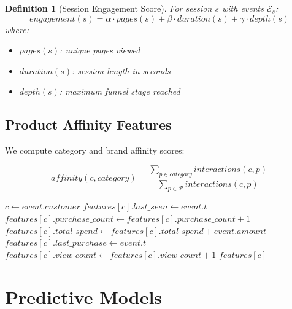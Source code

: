 \documentclass[11pt,a4paper]{article}
\newtheorem{definition}[theorem]{Definition}
\begin{document}
\begin{definition}[Session Engagement Score]
For session $s$ with events $\mathcal{E}_s$:
\begin{equation}
engagement(s) = \alpha \cdot pages(s) + \beta \cdot duration(s) + \gamma \cdot depth(s)
\end{equation}
where:
\begin{itemize}
    \item $pages(s)$: unique pages viewed
    \item $duration(s)$: session length in seconds
    \item $depth(s)$: maximum funnel stage reached
\end{itemize}
\end{definition}

\subsection{Product Affinity Features}

We compute category and brand affinity scores:

\begin{equation}
affinity(c, category) = \frac{\sum_{p \in category} interactions(c, p)}{\sum_{p \in \mathcal{P}} interactions(c, p)}
\end{equation}

\begin{algorithm}
\caption{Real-Time Feature Computation}
\begin{algorithmic}[1]
    \State $c \gets event.customer$
    \State $features[c].last\_seen \gets event.t$
        \State $features[c].purchase\_count \gets features[c].purchase\_count + 1$
        \State $features[c].total\_spend \gets features[c].total\_spend + event.amount$
        \State $features[c].last\_purchase \gets event.t$
        \State $features[c].view\_count \gets features[c].view\_count + 1$
        \State {}
    \EndIf
    \State {}
    \State \Return $features[c]$
\EndFunction
\end{algorithmic}
\end{algorithm}

\section{Predictive Models}
\end{document}
